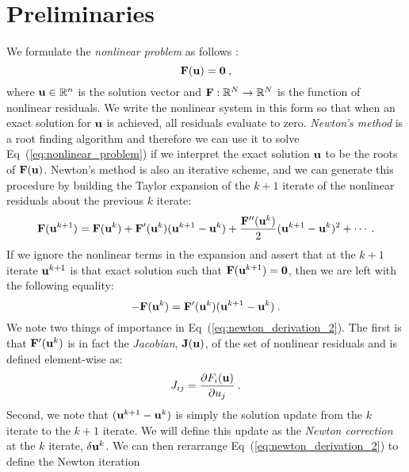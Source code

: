 \section{Preliminaries}
\label{sec:nonlinear_preliminaries}
We formulate the \textit{nonlinear problem} as follows
\citep{knoll_jacobian-free_2004}:
\begin{equation}
  \mathbf{F}(\mathbf{u}) = \mathbf{0}\:,
  \label{eq:nonlinear_problem}
\end{equation}
where $\mathbf{u} \in \mathbb{R}^n$ is the solution vector and
$\mathbf{F}:\mathbb{R}^N \rightarrow \mathbb{R}^N$ is the function of
nonlinear residuals. We write the nonlinear system in this form so
that when an exact solution for $\mathbf{u}$ is achieved, all residuals
evaluate to zero. \textit{Newton's method} is a root finding algorithm
and therefore we can use it to solve Eq~(\ref{eq:nonlinear_problem})
if we interpret the exact solution $\mathbf{u}$ to be the roots of
$\mathbf{F}(\mathbf{u})$. Newton's method is also an iterative scheme, and we
can generate this procedure by building the Taylor expansion of the
$k+1$ iterate of the nonlinear residuals about the previous $k$
iterate:
\begin{equation}
  \mathbf{F}(\mathbf{u}^{k+1}) = \mathbf{F}(\mathbf{u}^{k}) +
  \mathbf{F}'(\mathbf{u}^{k})(\mathbf{u}^{k+1}-\mathbf{u}^{k}) +
  \frac{\mathbf{F}''(\mathbf{u}^{k})}{2}(\mathbf{u}^{k+1}-\mathbf{u}^{k})^2 + \cdots
  \:.
  \label{eq:newton_derivation_1}
\end{equation}
If we ignore the nonlinear terms in the expansion and assert that at
the $k+1$ iterate $\mathbf{u}^{k+1}$ is that exact solution such that
$\mathbf{F}(\mathbf{u}^{k+1}) = \mathbf{0}$, then we are left with the following
equality:
\begin{equation}
  -\mathbf{F}(\mathbf{u}^{k}) =
  \mathbf{F}'(\mathbf{u}^{k})(\mathbf{u}^{k+1}-\mathbf{u}^{k})\:.
  \label{eq:newton_derivation_2}
\end{equation}
We note two things of importance in
Eq~(\ref{eq:newton_derivation_2}). The first is that
$\mathbf{F}'(\mathbf{u}^{k})$ is in fact the \textit{Jacobian},
$\mathbf{J}(\mathbf{u})$, of the set of nonlinear residuals and is defined
element-wise as:
\begin{equation}
  J_{ij} = \frac{\partial F_i(\mathbf{u})}{\partial u_j}\:.
  \label{eq:jacobian_def}
\end{equation}
Second, we note that $(\mathbf{u}^{k+1}-\mathbf{u}^{k})$ is simply the
solution update from the $k$ iterate to the $k+1$ iterate. We will
define this update as the \textit{Newton correction} at the $k$
iterate, $\delta \mathbf{u}^k$. We can then rerarrange
Eq~(\ref{eq:newton_derivation_2}) to define the Newton iteration
